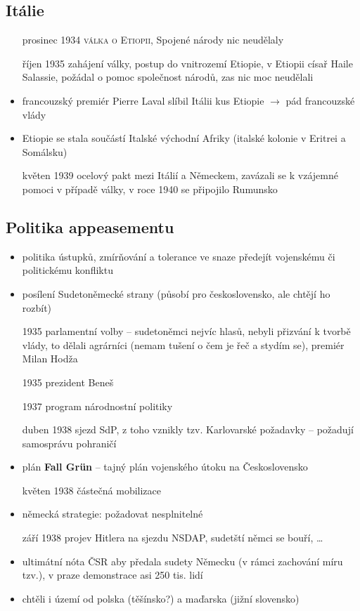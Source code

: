 \documentclass{article}
\begin{document}
\subsection*{Itálie}
\begin{itemize}
    \item[prosinec 1934] \textsc{válka o Etiopii}, Spojené národy nic neudělaly
    \item[říjen 1935] zahájení války, postup do vnitrozemí Etiopie, v Etiopii císař Haile Salassie, požádal o pomoc společnost národů, zas nic moc neudělali
    \item francouzský premiér Pierre Laval slíbil Itálii kus Etiopie $\rightarrow$ pád francouzské vlády
    \item Etiopie se stala součástí Italské východní Afriky (italské kolonie v Eritrei a Somálsku)
    \item[květen 1939] ocelový pakt mezi Itálií a Německem, zavázali se k vzájemné pomoci v případě války, v roce 1940 se připojilo Rumunsko
\end{itemize}

\subsection*{Politika appeasementu}
\begin{itemize}
    \item politika ústupků, zmírňování a tolerance ve snaze předejít vojenskému či politickému konfliktu
    \item posílení Sudetoněmecké strany (působí pro československo, ale chtějí ho rozbít)
    \item[1935] parlamentní volby -- sudetoněmci nejvíc hlasů, nebyli přizvání k tvorbě vlády, to dělali agrárníci (nemam tušení o čem je řeč a stydím se), premiér Milan Hodža
    \item[1935] prezident Beneš
    \item[1937] program národnostní politiky
    \item[duben 1938] sjezd SdP, z toho vznikly tzv. Karlovarské požadavky -- požadují samosprávu pohraničí
    \item plán \textbf{Fall Grün} -- tajný plán vojenského útoku na Československo
    \item[květen 1938] částečná mobilizace
    \item německá strategie: požadovat nesplnitelné
    \item[září 1938] projev Hitlera na sjezdu NSDAP, sudetští němci se bouří, \dots
    \item ultimátní nóta ČSR aby předala sudety Německu (v rámci zachování míru tzv.), v praze demonstrace asi 250 tis. lidí
    \item chtěli i území od polska (těšínsko?) a maďarska (jižní slovensko)
\end{itemize}
\end{document}
